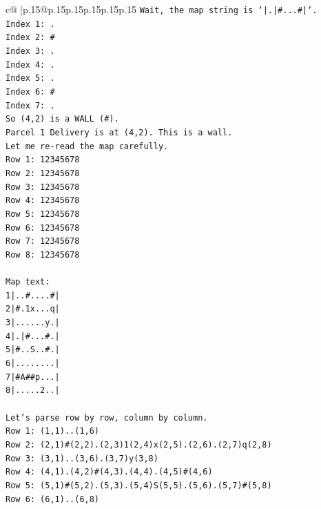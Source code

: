 \documentclass{article}
\begin{document}
{\begin{supertabular}{c@{$\;$}|p{.15\linewidth}@{}p{.15\linewidth}p{.15\linewidth}p{.15\linewidth}p{.15\linewidth}p{.15\linewidth}}
{{{\texttt{Wait, the map string is `|.|\#...\#|`.} \\
\texttt{Index 1: .} \\
\texttt{Index 2: \#} \\
\texttt{Index 3: .} \\
\texttt{Index 4: .} \\
\texttt{Index 5: .} \\
\texttt{Index 6: \#} \\
\texttt{Index 7: .} \\
\texttt{So (4,2) is a WALL (\#).} \\
\texttt{Parcel 1 Delivery is at (4,2). This is a wall.} \\
\texttt{Let me re{-}read the map carefully.} \\
\texttt{Row 1: 12345678} \\
\texttt{Row 2: 12345678} \\
\texttt{Row 3: 12345678} \\
\texttt{Row 4: 12345678} \\
\texttt{Row 5: 12345678} \\
\texttt{Row 6: 12345678} \\
\texttt{Row 7: 12345678} \\
\texttt{Row 8: 12345678} \\
\\ 
\texttt{Map text:} \\
\texttt{1|..\#....\#|} \\
\texttt{2|\#.1x...q|} \\
\texttt{3|......y.|} \\
\texttt{4|.|\#...\#.|} \\
\texttt{5|\#..S..\#.|} \\
\texttt{6|........|} \\
\texttt{7|\#A\#\#p...|} \\
\texttt{8|.....2..|} \\
\\ 
\texttt{Let's parse row by row, column by column.} \\
\texttt{Row 1: (1,1)..(1,6)} \\
\texttt{Row 2: (2,1)\#(2,2).(2,3)1(2,4)x(2,5).(2,6).(2,7)q(2,8)} \\
\texttt{Row 3: (3,1)..(3,6).(3,7)y(3,8)} \\
\texttt{Row 4: (4,1).(4,2)\#(4,3).(4,4).(4,5)\#(4,6)} \\
\texttt{Row 5: (5,1)\#(5,2).(5,3).(5,4)S(5,5).(5,6).(5,7)\#(5,8)} \\
\texttt{Row 6: (6,1)..(6,8)} \\
}}}
\end{supertabular}}
\end{document}
